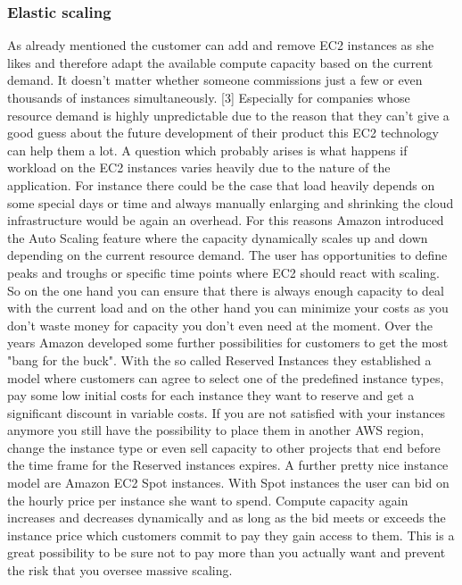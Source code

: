 \subsubsection{Elastic scaling}
As already mentioned the customer can add and remove EC2 instances as she likes and therefore adapt the available compute capacity based on the current demand. It doesn't matter whether someone commissions just a few or even thousands of instances simultaneously. [3] Especially for companies whose resource demand is highly unpredictable due to the reason that they can't give a good guess about the future development of their product this EC2 technology can help them a lot. A question which probably arises is what happens if workload on the EC2 instances varies heavily due to the nature of the application. For instance there could be the case that load heavily depends on some special days or time and always manually enlarging and shrinking the cloud infrastructure would be again an overhead. For this reasons Amazon introduced the Auto Scaling feature where the capacity dynamically scales up and down depending on the current resource demand. The user has opportunities to define peaks and troughs or specific time points where EC2 should react with scaling. So on the one hand you can ensure that there is always enough capacity to deal with the current load and on the other hand you can minimize your costs as you don't waste money for capacity you don't even need at the moment. Over the years Amazon developed some further possibilities for customers to get the most "bang for the buck". With the so called Reserved Instances they established a model where customers can agree to select one of the predefined instance types, pay some low initial costs for each instance they want to reserve and get a significant discount in variable costs. If you are not satisfied with your instances anymore you still have the possibility to place them in another AWS region, change the instance type or even sell capacity to other projects that end before the time frame for the Reserved instances expires. A further pretty nice instance model are Amazon EC2 Spot instances. With Spot instances the user can bid on the hourly price per instance she want to spend. Compute capacity again increases and decreases dynamically and as long as the bid meets or exceeds the instance price which customers commit to pay they gain access to them. This is a great possibility to be sure not to pay more than you actually want and prevent the risk that you oversee massive scaling. \cite{AWS_Overview}

